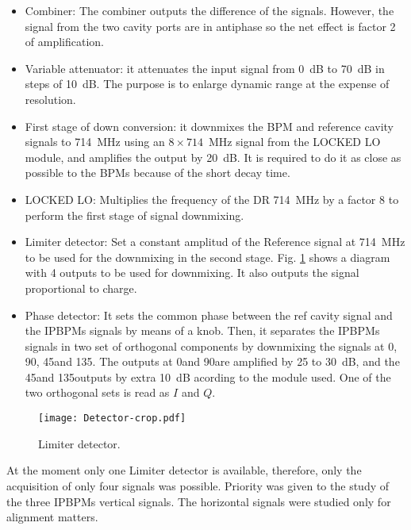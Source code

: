 \begin{itemize}
 \item Combiner: The combiner outputs the difference of the signals. However, the signal from the two cavity ports are in antiphase so the net effect is factor 2 of amplification.\par
 \item Variable attenuator: it attenuates the input signal from 0~dB to 70~dB in steps of 10~dB. The purpose is to enlarge dynamic range at the expense of resolution.\par
 \item First stage of down conversion: it downmixes the BPM and reference cavity signals to 714~MHz using an $8\times714$~MHz signal from the LOCKED LO module, and amplifies the output by 20~dB. It is required to do it as close as possible to the BPMs because of the short decay time.\par
 \item LOCKED LO: Multiplies the frequency of the DR 714~MHz by a factor 8 to perform the first stage of signal downmixing.\par
 \item Limiter detector: Set a constant amplitud of the Reference signal at 714~MHz to be used for the downmixing in the second stage. Fig. \ref{f:detector} shows a diagram with 4 outputs to be used for downmixing. It also outputs the signal proportional to charge.\par
 \item Phase detector: It sets the common phase between the ref cavity signal and the IPBPMs signals by means of a knob. Then, it separates the IPBPMs signals in two set of orthogonal components by downmixing the signals at 0\textdegree, 90\textdegree, 45\textdegree and 135\textdegree. The outputs at 0\textdegree and 90\textdegree are amplified by 25 to 30~dB, and the 45\textdegree and 135\textdegree outputs by extra 10~dB acording to the module used. One of the two orthogonal sets is read as $I$ and $Q$.\par
\end{itemize}
\begin{figure}[htb]
 \centering%
 \texttt{[image: Detector-crop.pdf]}\caption{Limiter detector.}\label{f:detector}
\end{figure}
At the moment only one Limiter detector is available, therefore, only the acquisition of only four signals was possible. Priority was given to the study of the three IPBPMs vertical signals. The horizontal signals were studied only for alignment matters.\par
